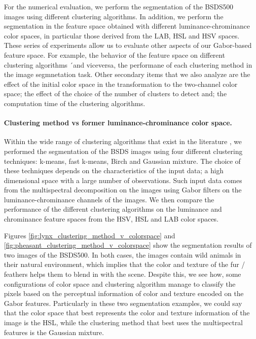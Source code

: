 For the numerical evaluation, we perform the segmentation of the BSDS500 images using different clustering algorithms. In addition, we perform the segmentation in the feature space obtained with different luminance-chrominance color spaces, in particular those derived from the LAB, HSL and HSV spaces. These series of experiments allow us to evaluate other aspects of our Gabor-based feature space. For example, the behavior of the feature space on different clustering algorithms ´and viceversa, the performane of each clustering method in the image segmnetation task. Other secondary items that we also analyze are the effect of the initial color space in the transformation to the two-channel color space; the effect of the choice of the number of clusters to detect and; the computation time of the clustering algorithms. 

\paragraph{Clustering method vs former luminance-chrominance color space.} 

Within the wide range of clustering algorithms that exist in the literature \citep{Omran.Engelbrecht.ea:IOS:2007} \citep{Sathya.Manavalan:IJCA:2011}, we performed the segmentation of the BSDS images using four different clustering techniques: k-means, fast k-means, Birch and Gaussian mixture. The choice of these techniques depends on the characteristics of the input data; a high dimensional space with a large number of observations. Such input data comes from the multispectral decomposition on the images using Gabor filters on the luminance-chrominance channels of the images. We then compare the performance of the different clustering algorithms on the luminance and chrominance feature spaces from the HSV, HSL and LAB color spaces. 

Figures \ref{fig:lynx_clustering_method_v_colorspace} and \ref{fig:pheasant_clustering_method_v_colorspace} show the segmentation results of two images of the BSDS500. In both cases, the images contain wild animals in their natural environment, which implies that the color and texture of the fur / feathers helps them to blend in with the scene. Despite this, we see how, some configurations of color space and clustering algorithm manage to classify the pixels based on the perceptual information of color and texture encoded on the Gabor features. Particularly in these two segmentation examples, we could say that the color space that best represents the color and texture information of the image is the HSL, while the clustering method that best uses the multispectral features is the Gaussian mixture. 

